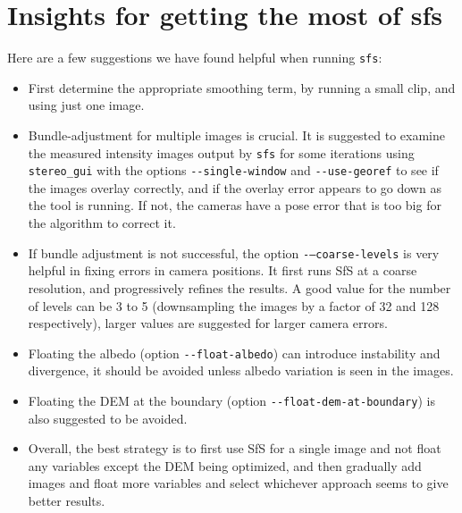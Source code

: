 \section{Insights for getting the most of sfs}
\label{sfs:insights}

Here are a few suggestions we have found helpful when running \texttt{sfs}:

\begin{itemize}{}
\item First determine the appropriate smoothing term, by running a small clip, and using just one image.

\item Bundle-adjustment for multiple images is crucial. It is suggested to examine the measured intensity images output by \texttt{sfs} for some iterations using \texttt{stereo\_gui} with the options \texttt{-\/-single-window} and \texttt{-\/-use-georef} to see if the images overlay correctly, and if the overlay error appears to go down as the tool is running. If not, the cameras have a pose error that is too big for the algorithm to correct it.

\item If bundle adjustment is not successful, the option
\texttt{-\/--coarse-levels} is very helpful in fixing errors in camera
positions. It first runs SfS at a coarse resolution, and progressively
refines the results. A good value for the number of levels can be 3 to 5
(downsampling the images by a factor of 32 and 128 respectively), larger
values are suggested for larger camera errors.

\item Floating the albedo (option \texttt{-\/-float-albedo}) can introduce instability and divergence, it should be avoided unless albedo variation is seen in the images.

\item Floating the DEM at the boundary (option \texttt{-\/-float-dem-at-boundary}) is also suggested to be avoided.

\item Overall, the best strategy is to first use SfS for a single image and not float any variables except the DEM being optimized, and then gradually add images and float more variables and select whichever approach seems to give better results.
\end{itemize}
